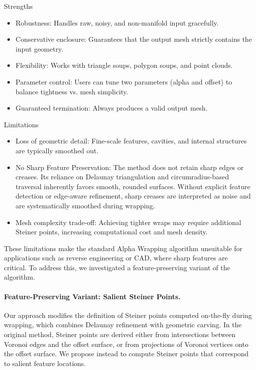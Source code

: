 Strengths
\begin{itemize}
\item Robustness: Handles raw, noisy, and non-manifold input gracefully.
\item Conservative enclosure: Guarantees that the output mesh strictly contains the input geometry.
\item Flexibility: Works with triangle soups, polygon soups, and point clouds.
\item Parameter control: Users can tune two parameters (alpha and offset) to balance tightness vs. mesh simplicity.
\item Guaranteed termination: Always produces a valid output mesh.
\end{itemize}

Limitations
\begin{itemize}
\item Loss of geometric detail: Fine-scale features, cavities, and internal structures are typically smoothed out.
\item No Sharp Feature Preservation: The method does not retain sharp edges or creases. Its reliance on Delaunay triangulation and circumradius-based traversal inherently favors smooth, rounded surfaces. Without explicit feature detection or edge-aware refinement, sharp creases are interpreted as noise and are systematically smoothed during wrapping.
\item Mesh complexity trade-off: Achieving tighter wraps may require additional Steiner points, increasing computational cost and mesh density.
\end{itemize}

These limitations make the standard Alpha Wrapping algorithm unsuitable for applications such as reverse engineering or CAD, where sharp features are critical. To address this, we investigated a feature-preserving variant of the algorithm.

\paragraph{Feature-Preserving Variant: Salient Steiner Points.}

Our approach modifies the definition of Steiner points computed on-the-fly during wrapping, which combines Delaunay refinement with geometric carving. In the original method, Steiner points are derived either from intersections between Voronoi edges and the offset surface, or from projections of Voronoi vertices onto the offset surface. We propose instead to compute Steiner points that correspond to salient feature locations.

